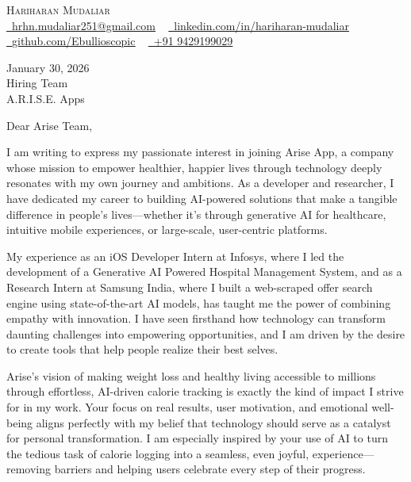 \documentclass[letterpaper,11pt]{article}
\begin{document}
\begin{center}
    {\Huge \scshape Hariharan Mudaliar} \\ \vspace{1pt}
    \href{mailto:hrhn.mudaliar251@gmail.com}{\raisebox{-0.2\height}\faEnvelope\ \underline{hrhn.mudaliar251@gmail.com}} ~
    \href{https://linkedin.com/in/hariharan-mudaliar}{\raisebox{-0.2\height}\faLinkedin\ \underline{linkedin.com/in/hariharan-mudaliar}} ~
    \href{https://github.com/Ebullioscopic}{\raisebox{-0.2\height}\faGithub\ \underline{github.com/Ebullioscopic}} ~
    \href{tel:+919429199029}{\raisebox{-0.2\height}\faPhone\ +91 9429199029}
\end{center}

\vspace{10pt}

January 30, 2026 \\
Hiring Team \\
A.R.I.S.E. Apps \\

\vspace{10pt}

Dear Arise Team,

I am writing to express my passionate interest in joining Arise App, a company whose mission to empower healthier, happier lives through technology deeply resonates with my own journey and ambitions. As a developer and researcher, I have dedicated my career to building AI-powered solutions that make a tangible difference in people's lives—whether it's through generative AI for healthcare, intuitive mobile experiences, or large-scale, user-centric platforms.

My experience as an iOS Developer Intern at Infosys, where I led the development of a Generative AI Powered Hospital Management System, and as a Research Intern at Samsung India, where I built a web-scraped offer search engine using state-of-the-art AI models, has taught me the power of combining empathy with innovation. I have seen firsthand how technology can transform daunting challenges into empowering opportunities, and I am driven by the desire to create tools that help people realize their best selves.

Arise’s vision of making weight loss and healthy living accessible to millions through effortless, AI-driven calorie tracking is exactly the kind of impact I strive for in my work. Your focus on real results, user motivation, and emotional well-being aligns perfectly with my belief that technology should serve as a catalyst for personal transformation. I am especially inspired by your use of AI to turn the tedious task of calorie logging into a seamless, even joyful, experience—removing barriers and helping users celebrate every step of their progress.
\end{document}
